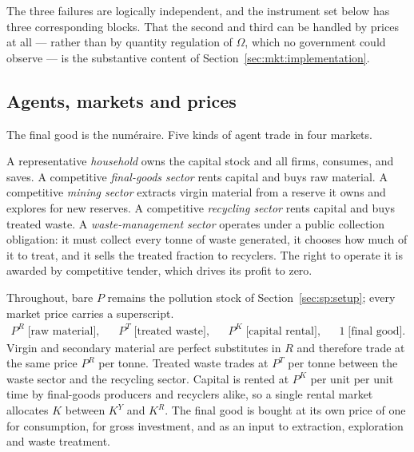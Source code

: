 The three failures are logically independent, and the instrument set below has three corresponding
blocks. That the second and third can be handled by prices at all --- rather than by quantity
regulation of $\Omega$, which no government could observe --- is the substantive content of
Section~\ref{sec:mkt:implementation}.

\subsection{Agents, markets and prices}\label{sec:mkt:setup:agents}

The final good is the numéraire. Five kinds of agent trade in four markets.

 A representative \emph{household} owns the capital stock and all firms, consumes,
and saves. A competitive \emph{final-goods sector} rents capital and buys raw material. A competitive
\emph{mining sector} extracts virgin material from a reserve it owns and explores for new reserves. A
competitive \emph{recycling sector} rents capital and buys treated waste. A \emph{waste-management
sector} operates under a public collection obligation: it must collect every tonne of waste generated,
it chooses how much of it to treat, and it sells the treated fraction to recyclers. The right to
operate it is awarded by competitive tender, which drives its profit to zero.

 Throughout, bare $P$ remains the pollution stock of
Section~\ref{sec:sp:setup}; every market price carries a superscript.
\begin{align}
P^R \;\text{[raw material]},
&&
P^T \;\text{[treated waste]},
&&
P^K \;\text{[capital rental]},
&&
1 \;\text{[final good]}.
\label{eq:mkt:prices}
\end{align}
Virgin and secondary material are perfect substitutes in $R$ and therefore trade at the same price
$P^R$ per tonne. Treated waste trades at $P^T$ per tonne between the waste sector and the recycling
sector. Capital is rented at $P^K$ per unit per unit time by final-goods producers and recyclers
alike, so a single rental market allocates $K$ between $K^Y$ and $K^R$. The final good is bought at
its own price of one for consumption, for gross investment, and as an input to extraction, exploration
and waste treatment.

